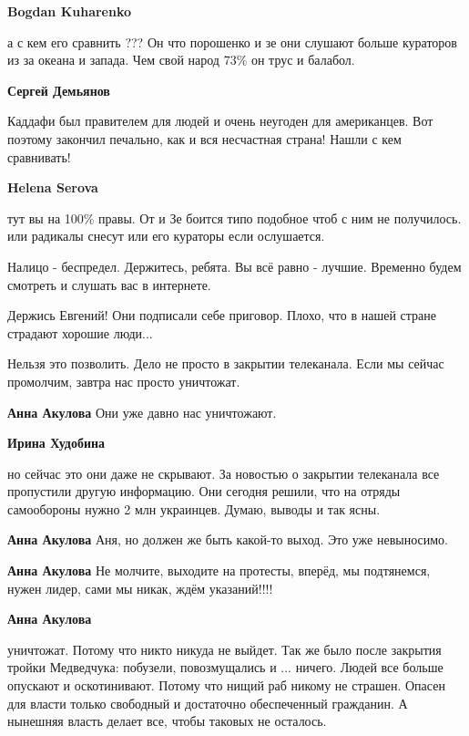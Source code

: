 \begin{itemize}
\begin{itemize}
\textbf{Bogdan Kuharenko} 

а с кем его сравнить ??? Он что порошенко и зе они слушают больше кураторов из
за океана и запада. Чем свой народ 73\% он трус и балабол.

\textbf{Сергей Демьянов} 

Каддафи был правителем для людей и очень неугоден для американцев. Вот поэтому
закончил печально, как и вся несчастная страна! Нашли с кем сравнивать!

\textbf{Helena Serova} 

тут вы на 100\% правы. От и Зе боится типо подобное чтоб с ним не получилось.
или радикалы снесут или его кураторы если ослушается.

\end{itemize} %

Налицо - беспредел. Держитесь, ребята. Вы всё равно - лучшие. Временно будем
смотреть и слушать вас в интернете.

Держись Евгений! Они подписали себе приговор. Плохо, что в нашей стране
страдают хорошие люди...


Нельзя это позволить. Дело не просто в закрытии телеканала. Если мы сейчас
промолчим, завтра нас просто уничтожат.

\begin{itemize} %
\textbf{Анна Акулова} Они уже давно нас уничтожают.

\textbf{Ирина Худобина} 

но сейчас это они даже не скрывают. За новостью о закрытии телеканала все
пропустили другую информацию. Они сегодня решили, что на отряды самообороны
нужно 2 млн украинцев. Думаю, выводы и так ясны.

\textbf{Анна Акулова} Аня, но должен же быть какой-то выход. Это уже невыносимо.

\textbf{Анна Акулова} Не молчите, выходите на протесты, вперёд, мы подтянемся, нужен лидер, сами мы никак, ждём указаний!!!!

\textbf{Анна Акулова} 

уничтожат. Потому что никто никуда не выйдет. Так же было после закрытия тройки
Медведчука: побузели, повозмущались и ... ничего. Людей все больше опускают и
оскотинивают. Потому что нищий раб никому не страшен. Опасен для власти только
свободный и достаточно обеспеченный гражданин. А нынешняя власть делает все,
чтобы таковых не осталось.


\end{itemize}
\end{itemize}
